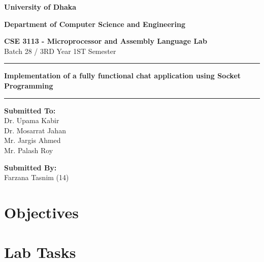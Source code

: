 \documentclass[a4paper,12pt]{article}
\begin{document}
\begin{titlepage}
    \begin{center}
        
        \Huge
        \textbf{University of Dhaka}
        
        \vspace{1cm}
        \LARGE
        \textbf{Department of Computer Science and Engineering}
        
        \vspace{1cm}
       
        \textbf{CSE 3113 - Microprocessor and Assembly Language Lab} \\
        Batch 28 / 3RD Year 1ST Semester\\
        \vspace{1cm}

        \noindent\rule{\linewidth}{0.5mm} %

\begin{center}
    \LARGE\textbf{Implementation of a fully functional chat application using Socket Programming}
\end{center}

\noindent\rule{\linewidth}{0.5mm} %

        
        \vspace{1.5cm}
        \textbf{Submitted To: \\ }Dr. Upama Kabir \\
        Dr. Mosarrat Jahan \\
        Mr. Jargis Ahmed \\
        Mr. Palash Roy \\
        \vspace{1cm}
        
        \vspace{1cm}
        \textbf{Submitted By:} \\ Farzana Tasnim (14) \\ 
        
        \vfill
        
        \Large
        
        \vspace{2cm}
        
    \end{center}
\end{titlepage}


\section{Objectives}

\section{Lab Tasks}
\end{document}
